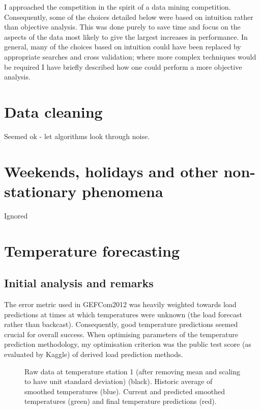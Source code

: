 \documentclass[preprint,authoryear,12pt]{elsarticle}
\begin{document}

I approached the competition in the spirit of a data mining competition.
Consequently, some of the choices detailed below were based on intuition rather than objective analysis.
This was done purely to save time and focus on the aspects of the data most likely to give the largest increases in performance.
In general, many of the choices based on intuition could have been replaced by appropriate searches and cross validation; where more complex techniques would be required I have briefly described how one could perform a more objective analysis.


\section{Data cleaning}

Seemed ok - let algorithms look through noise.

\section{Weekends, holidays and other non-stationary phenomena}

Ignored

\section{Temperature forecasting}

\subsection{Initial analysis and remarks}

The error metric used in GEFCom2012 was heavily weighted towards load predictions at times at which temperatures were unknown (\ie the load forecast rather than backcast).
Consequently, good temperature predictions seemed crucial for overall success.
When optimising parameters of the temperature prediction methodology, my optimisation criterion was the public test score (as evaluated by Kaggle) of derived load prediction methods.

\begin{figure}[ht]
  \begin{center}
    
  \end{center}
  \caption{Raw data at temperature station 1 (after removing mean and scaling to have unit standard deviation) (black). Historic average of smoothed temperatures (blue). Current and predicted smoothed temperatures (green) and final temperature predictions (red).}
  \label{fig:temp_pred}
\end{figure}
\end{document}
